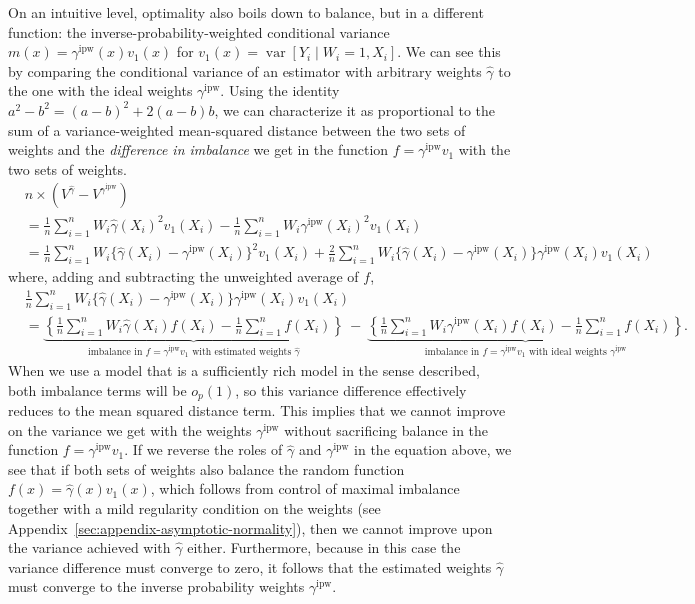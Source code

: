 \documentclass{article}
\theoremstyle{definition}
\DeclareMathOperator{\Var}{var}
\newcommand{\ipw}{\text{ipw}}
\newcommand{\hgamma}{\ensuremath{\hat\gamma}}
\newcommand{\gammaipw}{\ensuremath{\gamma^{\ipw}}}
\newcommand{\<}{\langle}
\renewcommand{\>}{\rangle}
\begin{document}
On an intuitive level, optimality also boils down to balance, but in a different function: the inverse-probability-weighted conditional variance $m(x)=\gammaipw(x)v_1(x)$ for $v_1(x)=\Var[Y_i \mid W_i=1, X_i]$.
We can see this by comparing the conditional variance of an estimator with arbitrary weights $\hgamma$ to the one with the ideal weights $\gammaipw$. Using the identity $a^2-b^2=(a-b)^2 + 2(a-b)b$, we can characterize it as proportional to the sum of a variance-weighted mean-squared distance between the two sets of weights and the \emph{difference in imbalance} we get in the function  $f=\gammaipw v_1$ with the two sets of weights.
\begin{equation}
\begin{aligned}
&n \times (V^{\hat\gamma} - V^{\gammaipw}) \\
&= \frac{1}{n}\sum_{i=1}^n W_i \hgamma(X_i)^2 v_1(X_i) - \frac{1}{n}\sum_{i=1}^n W_i \gammaipw(X_i)^2 v_1(X_i)
\\
&= \frac{1}{n}\sum_{i=1}^n W_i \{\hgamma(X_i)-\gammaipw(X_i)\}^2 v_1(X_i) +
\frac{2}{n}\sum_{i=1}^n W_i \{\hgamma(X_i)-\gammaipw(X_i)\} \gammaipw(X_i) v_1(X_i)
\end{aligned}
\end{equation}
where, adding and subtracting the unweighted average of $f$,
\begin{equation}
\begin{aligned}
&\frac{1}{n}\sum_{i=1}^n W_i \{\hgamma(X_i)-\gammaipw(X_i)\} \gammaipw(X_i) v_1(X_i) \\
&= \underbrace{\left\{\frac{1}{n}\sum_{i=1}^n W_i \hgamma(X_i) f(X_i) - \frac{1}{n}\sum_{i=1}^n f(X_i)\right\}}_{\text{imbalance in $f=\gammaipw v_1$ with estimated weights $\hgamma$}} \ - \  \underbrace{\left\{\frac{1}{n}\sum_{i=1}^n W_i \gammaipw(X_i) f(X_i) - \frac{1}{n}\sum_{i=1}^n f(X_i)\right\}}_\text{imbalance in $f=\gammaipw v_1$ with ideal weights $\gammaipw$}.
\end{aligned}
\end{equation}
When we use a model that is a sufficiently rich model in the sense described, both imbalance terms will be $o_p(1)$, so this variance difference effectively reduces to the mean squared distance term. This implies that we cannot improve on the variance we get with the weights $\gammaipw$ without sacrificing balance in the function $f=\gammaipw v_1$. If we reverse the roles of $\hat\gamma$ and $\gammaipw$ in the equation above, we see that if both sets of weights also balance the random function $f(x)=\hgamma(x) v_1(x)$, which follows from control of maximal imbalance together with a mild regularity condition on the weights (see Appendix~\ref{sec:appendix-asymptotic-normality}), then we cannot improve upon the variance achieved with $\hat\gamma$ either. Furthermore, because in this case the variance difference must converge to zero, it follows that the estimated weights $\hat\gamma$ must converge to the inverse probability weights $\gammaipw$.
\end{document}
